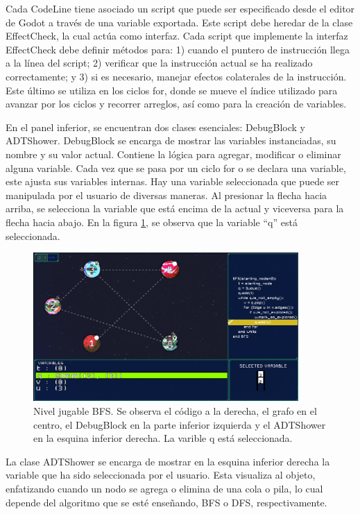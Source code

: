 Cada CodeLine tiene asociado un script que puede ser especificado desde el editor de Godot a través de una variable exportada. Este script debe heredar de la clase EffectCheck, la cual actúa como interfaz. Cada script que implemente la interfaz EffectCheck debe definir métodos para: 1) cuando el puntero de instrucción llega a la línea del script; 2) verificar que la instrucción actual se ha realizado correctamente; y 3) si es necesario, manejar efectos colaterales de la instrucción. Este último se utiliza en los ciclos for, donde se mueve el índice utilizado para avanzar por los ciclos y recorrer arreglos, así como para la creación de variables.

En el panel inferior, se encuentran dos clases esenciales: DebugBlock y ADTShower. DebugBlock se encarga de mostrar las variables instanciadas, su nombre y su valor actual. Contiene la lógica para agregar, modificar o eliminar alguna variable. Cada vez que se pasa por un ciclo for o se declara una variable, este ajusta sus variables internas. Hay una variable seleccionada que puede ser manipulada por el usuario de diversas maneras. Al presionar la flecha hacia arriba, se selecciona la variable que está encima de la actual y viceversa para la flecha hacia abajo. En la figura \ref{BFSFullGame}, se observa que la variable ``q'' está seleccionada.

\begin{figure}[h]
	\centering
	\includegraphics[width=0.9\textwidth]{imagenes/BFSFullGame.png}
	\caption{Nivel jugable BFS. Se observa el código a la derecha, el grafo en el centro, el DebugBlock en la parte inferior izquierda y el ADTShower en la esquina inferior derecha. La varible q está seleccionada.}
	\label{BFSFullGame}
\end{figure}

La clase ADTShower se encarga de mostrar en la esquina inferior derecha la variable que ha sido seleccionada por el usuario. Esta visualiza al objeto, enfatizando cuando un nodo se agrega o elimina de una cola o pila, lo cual depende del algoritmo que se esté enseñando, BFS o DFS, respectivamente.

